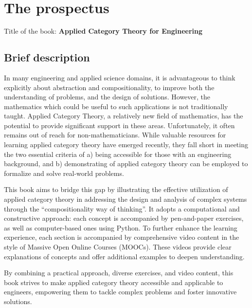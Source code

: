 \documentclass[10pt, article, one side]{memoir}
\begin{document}
    \newpage

    \chapter{The prospectus}
    Title of the book: \textbf{Applied Category Theory for Engineering}
    \section{Brief description}
    In many engineering and applied science domains, it is advantageous to think explicitly about abstraction and compositionality, to improve both the understanding of problems, and the design of solutions.
    However, the mathematics which could be useful to such applications is not traditionally taught.
    Applied Category Theory, a relatively new field of mathematics, has the potential to provide significant support in these areas.
    Unfortunately, it often remains out of reach for non-mathematicians.
    While valuable resources for learning applied category theory have emerged recently, they fall short in meeting the two essential criteria of a) being accessible for those with an engineering background, and b) demonstrating of applied category theory can be employed to formalize and solve real-world problems.

    This book aims to bridge this gap by illustrating the effective utilization of applied category theory in addressing the design and analysis of complex systems through the “compositionality way of thinking”.
    It adopts a computational and constructive approach: each concept is accompanied by pen-and-paper exercises, as well as computer-based ones using Python.
    To further enhance the learning experience, each section is accompanied by comprehensive video content in the style of Massive Open Online Courses (MOOCs).
    These videos provide clear explanations of concepts and offer additional examples to deepen understanding.

    By combining a practical approach, diverse exercises, and video content, this book strives to make applied category theory accessible and applicable to engineers, empowering them to tackle complex problems and foster innovative solutions.
\end{document}
